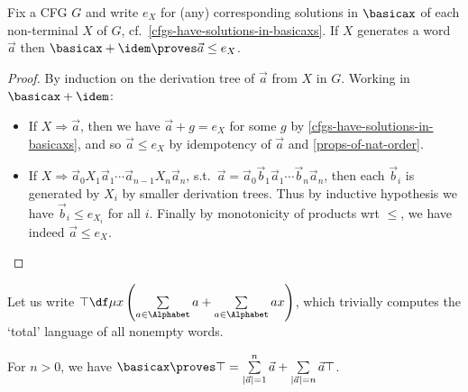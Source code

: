 \begin{lemma}
\label{lem:membership}
    Fix a CFG $G $ and write $ e_X$ for (any) corresponding solutions in $\basicax$ of each non-terminal $X$ of $G$, cf.~\cref{cfgs-have-solutions-in-basicaxs}. 
    If $X$ generates a word $\vec a$ then $\basicax + \idem \proves \vec a \leq e_X$.
\end{lemma}
\begin{proof}
    By induction on the derivation tree of $\vec a $ from $X$ in $G$.
    Working in $\basicax+\idem$:
    \begin{itemize}
        \item If $X \Rightarrow \vec a$, then we have $\vec a + g = e_X$ for some $g$ by \cref{cfgs-have-solutions-in-basicaxs}, and so $\vec a \leq e_X$ by idempotency of $\vec a$ and \cref{props-of-nat-order}.
        \item If $X \Rightarrow \vec a_0 X_1 \vec a_1 \cdots \vec a_{n-1}  X_n \vec a_n$, s.t.\ $\vec a = \vec a_0 \vec b_1 \vec a_1 \cdots \vec b_n \vec a_n$, then each $\vec b_i $ is generated by $X_i$ by smaller derivation trees.
        Thus by inductive hypothesis we have $\vec b_i \leq e_{X_i}$ for all $i$.
        Finally by monotonicity of products wrt $\leq$, we have indeed $\vec a \leq e_X$.\qedhere
    \end{itemize}
\end{proof}

Let us write $\top \df \mu x \left(\sum\limits_{a \in \Alphabet} a + \sum\limits_{a\in \Alphabet} ax \right)$, which trivially computes the `total' language of all nonempty words.

\begin{lemma}
\label{lem:unfolding-top}
    For $n>0$, we have $\basicax \proves \top = \sum\limits_{|\vec a|=1}^{n}\vec a + \sum\limits_{|\vec a|= n} \vec a \top$.
\end{lemma}

